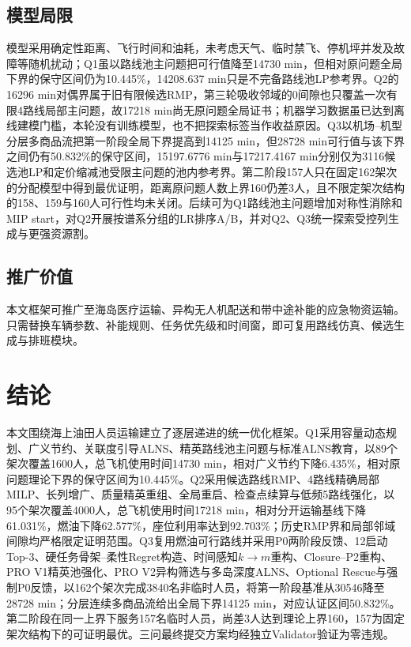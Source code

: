 \documentclass[UTF8,a4paper,zihao=5]{ctexart}
\begin{document}
\subsection{模型局限}
模型采用确定性距离、飞行时间和油耗，未考虑天气、临时禁飞、停机坪并发及故障等随机扰动；Q1虽以路线池主问题把可行值降至14730 min，但相对原问题全局下界的保守区间仍为10.445\%，14208.637 min只是不完备路线池LP参考界。Q2的16296 min对偶界属于旧有限候选RMP，第三轮吸收邻域的0间隙也只覆盖一次有限4路线局部主问题，故17218 min尚无原问题全局证书；机器学习数据虽已达到离线建模门槛，本轮没有训练模型，也不把探索标签当作收益原因。Q3以机场--机型分层多商品流把第一阶段全局下界提高到14125 min，但28728 min可行值与该下界之间仍有50.832\%的保守区间，15197.6776 min与17217.4167 min分别仅为3116候选池LP和定价缩减池受限主问题的池内参考界。第二阶段157人只在固定162架次的分配模型中得到最优证明，距离原问题人数上界160仍差3人，且不限定架次结构的158、159与160人可行性均未关闭。后续可为Q1路线池主问题增加对称性消除和MIP start，对Q2开展按谱系分组的LR排序A/B，并对Q2、Q3统一探索受控列生成与更强资源割。

\subsection{推广价值}
本文框架可推广至海岛医疗运输、异构无人机配送和带中途补能的应急物资运输。只需替换车辆参数、补能规则、任务优先级和时间窗，即可复用路线仿真、候选生成与排班模块。

\section{结论}
本文围绕海上油田人员运输建立了逐层递进的统一优化框架。Q1采用容量动态规划、广义节约、关联度引导ALNS、精英路线池主问题与标准ALNS教育，以89个架次覆盖1600人，总飞机使用时间14730 min，相对广义节约下降6.435\%，相对原问题理论下界的保守区间为10.445\%。Q2采用候选路线RMP、4路线精确局部MILP、长列增广、质量精英重组、全局重启、检查点续算与低频5路线强化，以95个架次覆盖4000人，总飞机使用时间17218 min，相对分开运输基线下降61.031\%，燃油下降62.577\%，座位利用率达到92.703\%；历史RMP界和局部邻域间隙均严格限定证明范围。Q3复用燃油可行路线并采用P0两阶段反馈、12启动Top-$3$、硬任务骨架--柔性Regret构造、时间感知$k\to m$重构、Closure--P2重构、PRO V1精英池强化、PRO V2异构筛选与多岛深度ALNS、Optional Rescue与强制P0反馈，以162个架次完成3840名非临时人员，将第一阶段基准从30546降至28728 min；分层连续多商品流给出全局下界14125 min，对应认证区间50.832\%。第二阶段在同一上界下服务157名临时人员，尚差3人达到理论上界160，157为固定架次结构下的可证明最优。三问最终提交方案均经独立Validator验证为零违规。
\end{document}
